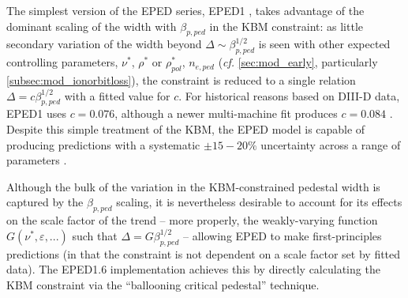 \noindent The simplest version of the EPED series, EPED1 \cite{Snyder2009}, takes advantage of the dominant scaling of the width with $\beta_{p,ped}$ in the KBM constraint: as little secondary variation of the width beyond $\Delta \sim \beta_{p,ped}^{1/2}$ is seen with other expected controlling parameters, \eg $\nu^*$, $\rho^*$ or $\rho^*_{pol}$, $n_{e,ped}$ \cite{Snyder2009} (\emph{cf.} \cref{sec:mod_early}, particularly \cref{subsec:mod_ionorbitloss}), the constraint is reduced to a single relation $\Delta = c \beta_{p,ped}^{1/2}$ with a fitted value for $c$.  For historical reasons based on DIII-D data, EPED1 uses $c = 0.076$, although a newer multi-machine fit produces $c = 0.084$ \cite{Snyder2011}.  Despite this simple treatment of the KBM, the EPED model is capable of producing predictions with a systematic $\pm 15-20\%$ uncertainty across a range of parameters \cite{Snyder2009,Snyder2010}.

Although the bulk of the variation in the KBM-constrained pedestal width is captured by the $\beta_{p,ped}$ scaling, it is nevertheless desirable to account for its effects on the scale factor of the trend -- more properly, the weakly-varying function $G(\nu^*,\varepsilon,...)$ such that $\Delta = G \beta_{p,ped}^{1/2}$ -- allowing EPED to make first-principles predictions (in that the constraint is not dependent on a scale factor set by fitted data).  The EPED1.6 implementation \cite{Snyder2010,Snyder2011} achieves this by directly calculating the KBM constraint via the ``ballooning critical pedestal'' technique.  

\begin{figure}[ht]
 \pushtooutside
\end{figure}


